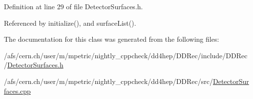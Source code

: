 Definition at line 29 of file Detector\+Surfaces.\+h.



Referenced by initialize(), and surface\+List().



The documentation for this class was generated from the following files\+:\begin{DoxyCompactItemize}
\item 
/afs/cern.\+ch/user/m/mpetric/nightly\+\_\+cppcheck/dd4hep/\+D\+D\+Rec/include/\+D\+D\+Rec/\hyperlink{_detector_surfaces_8h}{Detector\+Surfaces.\+h}\item 
/afs/cern.\+ch/user/m/mpetric/nightly\+\_\+cppcheck/dd4hep/\+D\+D\+Rec/src/\hyperlink{_detector_surfaces_8cpp}{Detector\+Surfaces.\+cpp}\end{DoxyCompactItemize}
